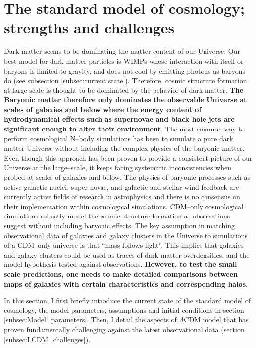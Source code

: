 \documentclass[paper=a4, fontsize=11pt]{scrartcl} %
\numberwithin{equation}{section} %
\numberwithin{figure}{section} %
\numberwithin{table}{section} %
\begin{document}
\section{The standard model of cosmology; strengths and challenges}
\label{sec:LCDM}
Dark matter seems to be dominating the matter content of our Universe. Our best model for dark matter particles is WIMPs whose interaction with itself or baryons is limited to gravity, and does not cool by emitting photons as baryons do (see subsection \ref{subsec:current state}). Therefore, cosmic structure formation at large scale is thought to be dominated by the behavior of dark matter. {\bf The Baryonic matter therefore only dominates the observable Universe at scales of galaxies and below where the energy content of hydrodynamical effects such as supernovae and black hole jets are significant enough to alter their environment.} The most common way to perform cosmological N--body simulations has been to simulate a pure dark matter Universe without including the complex physics of the baryonic matter. Even though this approach has been proven to provide a consistent picture of our Universe at the large--scale, it keeps facing systematic inconsistencies when probed at scales of galaxies and below. The physics of baryonic processes such as active galactic nuclei, super novae, and galactic and stellar wind feedback are currently active fields of research in astrophysics and there is no consensus on their implementation within cosmological simulations. CDM--only cosmological simulations robustly model the cosmic structure formation as observations suggest without including baryonic effects. The key assumption in matching observational data of galaxies and galaxy clusters in the Universe to simulations of a CDM--only universe is that ``mass follows light''. This implies that galaxies and galaxy clusters could be used as traces of dark matter overdensities, and the model hypothesis tested against observations. {\bf However, to test the small--scale predictions, one needs to make detailed comparisons between maps of galaxies with certain characteristics and corresponding halos.}

In this section, I first briefly introduce the current state of the standard model of cosmology, the model parameters, assumptions and initial conditions in  section \ref{subsec:Model_parameters}. Then, I detail the aspects of $\Lambda$CDM model that has proven fundamentally challenging against the latest observational data (section \ref{subsec:LCDM_challenges}).
\end{document}
